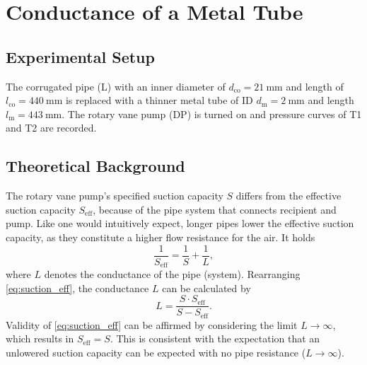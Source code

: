 \chapter{Conductance of a Metal Tube}
\section{Experimental Setup}
The corrugated pipe (L) with an inner diameter of $d_\text{co}=\SI{21}{\milli\meter}$ and length of $l_\text{co}=\SI{440}{\milli\meter}$ is replaced with a thinner metal tube of ID $d_\text{m}=\SI{2}{\milli\meter}$ and length $l_\text{m}=\SI{443}{\milli\meter}$.
The rotary vane pump (DP) is turned on and pressure curves of T1 and T2 are recorded.

\section{Theoretical Background}
The rotary vane pump's specified suction capacity $S$ differs from the effective suction capacity $S_\text{eff}$, because of the pipe system that connects recipient and pump.
Like one would intuitively expect, longer pipes lower the effective suction capacity, as they constitute a higher flow resistance for the air.
It holds
\begin{equation}\label{eq:suction_eff}
	\frac{1}{S_\text{eff}}=\frac{1}{S}+\frac{1}{L},
\end{equation}
where $L$ denotes the conductance of the pipe (system).
Rearranging \autoref{eq:suction_eff}, the conductance $L$ can be calculated by
\begin{equation}\label{eq:conductance}
	L=\frac{S\cdot S_\text{eff}}{S-S_\text{eff}}.
\end{equation}
Validity of \autoref{eq:suction_eff} can be affirmed by considering the limit $L\rightarrow\infty$, which results in $S_\text{eff}=S$.
This is consistent with the expectation that an unlowered suction capacity can be expected with no pipe resistance ($L\rightarrow\infty$).

